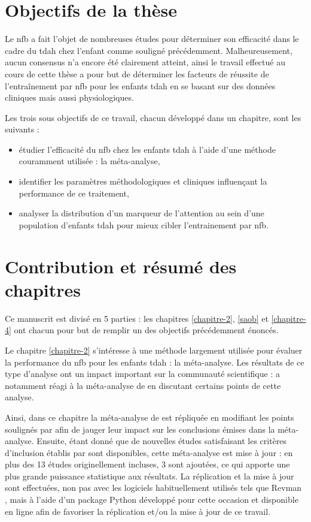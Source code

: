 \section{Objectifs de la thèse}
Le \gls{nfb} a fait l'objet de nombreuses études pour déterminer son efficacité dans le cadre du \gls{tdah} chez l'enfant comme souligné précédemment.
Malheureusement, aucun consensus n'a encore été clairement atteint, ainsi le travail effectué au cours de cette thèse a pour but de déterminer les facteurs 
de réussite de l'entraînement par \gls{nfb} pour les enfants \gls{tdah} en se basant sur des données cliniques mais aussi physiologiques. 

Les trois sous objectifs de ce travail, chacun développé dans un chapitre, sont les suivants :
\renewcommand{\labelitemi}{$\bullet$}
\renewcommand{\labelitemii}{$\cdot$}
\begin{itemize}
\item étudier l'efficacité du \gls{nfb} chez les enfants \gls{tdah} à l'aide d'une méthode couramment utilisée : la méta-analyse,
\item identifier les paramètres méthodologiques et cliniques influençant la performance de ce traitement,
\item analyser la distribution d'un marqueur de l'attention au sein d'une population d'enfants \gls{tdah} pour mieux cibler
l'entrainement par \gls{nfb}. 
\end{itemize}

\section{Contribution et résumé des chapitres}

Ce manuscrit est divisé en 5 parties : les chapitres \ref{chapitre-2}, \ref{saob} et \ref{chapitre-4} ont chacun pour but de remplir un des objectifs précédemment énoncés.

Le chapitre \ref{chapitre-2} s'intéresse à une méthode largement utilisée pour évaluer la performance du \gls{nfb} pour les enfants \gls{tdah} 
\citep{Sonuga-Barke2013, Micoulaud2014, Cortese2016} : la méta-analyse. Les résultats de ce type d'analyse ont un impact important sur la
communauté scientifique : \citet{Micoulaud2016} a notamment réagi à la méta-analyse de \citet{Cortese2016} en discutant certains points de cette 
analyse. 

Ainsi, dans ce chapitre la méta-analyse de \citet{Cortese2016} est répliquée en modifiant les points soulignés par \citet{Micoulaud2016}
afin de jauger leur impact sur les conclusions émises dans la méta-analyse. Ensuite, étant donné que de nouvelles études satisfaisant les critères d'inclusion
établis par \citet{Cortese2016} sont disponibles, cette méta-analyse est mise à jour : en plus des 13 études originellement incluses, 3
sont ajoutées, ce qui apporte une plus grande puissance statistique aux résultats. La réplication et la mise à jour sont effectuées, non pas avec les logiciels 
habituellement utilisés tels que Revman \citep{Revman}, mais à l'aide d'un package Python développé pour cette occasion et disponible en ligne afin de favoriser 
la réplication et/ou la mise à jour de ce travail. 


